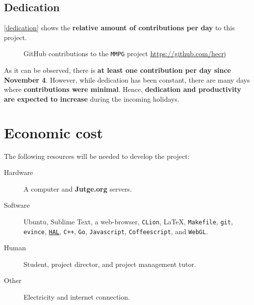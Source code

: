 \documentclass[a4paper,11pt,titlepage,abstract,numbers=noenddot,automark,mnsy,intlimits,rgb,dvipsnames]{report}
\begin{document}
\section{Dedication}
\autoref{dedication} shows the \textbf{relative amount of contributions per day} to this project.
\begin{figure}[H]
\caption{GitHub contributions to the \texttt{MMPG} project \url{https://github.com/hecrj}}
\label{dedication}
\end{figure}
As it can be observed, there is \textbf{at least one contribution per day since November 4}. However, while dedication has
been constant, there are many days where \textbf{contributions were minimal}. Hence, \textbf{dedication and productivity are expected
to increase} during the incoming holidays.
\clearpage
\chapter{Economic cost}
The following resources will be needed to develop the project:
\begin{description}
\item[Hardware]
A computer and \textbf{Jutge.org} servers.
\item[Software]
Ubuntu, Sublime Text, a web-browser, \texttt{CLion}, \LaTeX{}, \texttt{Makefile}, \texttt{git}, \texttt{evince},
  \href{https://github.com/hecrj/hal/raw/master/doc/full/report.pdf}{\texttt{HAL}}, \texttt{C++}, \texttt{Go},
  \texttt{Javascript}, \texttt{Coffeescript}, and \texttt{WebGL}.
\item[Human]
Student, project director, and project management tutor.
\item[Other]
Electricity and internet connection.
\end{description}
\end{document}

